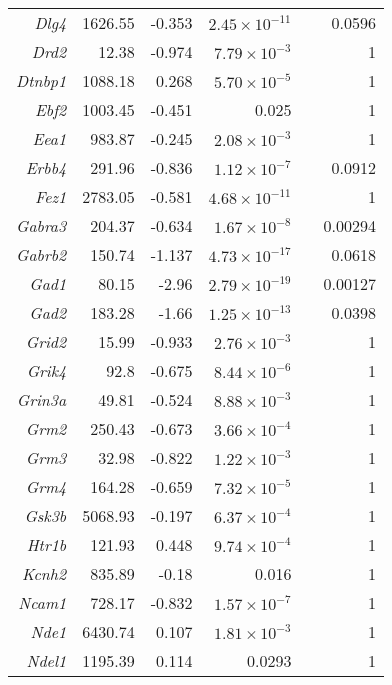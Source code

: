 {\begin{longtable}{rrrrrr}
    \textit{Dlg4} & 1626.55 & -0.353 & $2.45\times 10^{-11}$ &       & 0.0596 \\
    \textit{Drd2} & 12.38 & -0.974 & $7.79\times 10^{-3}$ &       & 1 \\
    \textit{Dtnbp1} & 1088.18 & 0.268 & $5.70\times 10^{-5}$ &       & 1 \\
    \textit{Ebf2} & 1003.45 & -0.451 & 0.025 &       & 1 \\
    \textit{Eea1} & 983.87 & -0.245 & $2.08\times 10^{-3}$ &       & 1 \\
    \textit{Erbb4} & 291.96 & -0.836 & $1.12\times 10^{-7}$ &       & 0.0912 \\
    \textit{Fez1} & 2783.05 & -0.581 & $4.68\times 10^{-11}$ &       & 1 \\
    \textit{Gabra3} & 204.37 & -0.634 & $1.67\times 10^{-8}$ &       & 0.00294 \\
    \textit{Gabrb2} & 150.74 & -1.137 & $4.73\times 10^{-17}$ &       & 0.0618 \\
    \textit{Gad1} & 80.15 & -2.96 & $2.79\times 10^{-19}$ &       & 0.00127 \\
    \textit{Gad2} & 183.28 & -1.66 & $1.25\times 10^{-13}$ &       & 0.0398 \\
    \textit{Grid2} & 15.99 & -0.933 & $2.76\times 10^{-3}$ &       & 1 \\
    \textit{Grik4} & 92.8  & -0.675 & $8.44\times 10^{-6}$ &       & 1 \\
    \textit{Grin3a} & 49.81 & -0.524 & $8.88\times 10^{-3}$ &       & 1 \\
    \textit{Grm2} & 250.43 & -0.673 & $3.66\times 10^{-4}$ &       & 1 \\
    \textit{Grm3} & 32.98 & -0.822 & $1.22\times 10^{-3}$ &       & 1 \\
    \textit{Grm4} & 164.28 & -0.659 & $7.32\times 10^{-5}$ &       & 1 \\
    \textit{Gsk3b} & 5068.93 & -0.197 & $6.37\times 10^{-4}$ &       & 1 \\
    \textit{Htr1b} & 121.93 & 0.448 & $9.74\times 10^{-4}$ &       & 1 \\
    \textit{Kcnh2} & 835.89 & -0.18 & 0.016 &       & 1 \\
    \textit{Ncam1} & 728.17 & -0.832 & $1.57\times 10^{-7}$ &       & 1 \\
    \textit{Nde1} & 6430.74 & 0.107 & $1.81\times 10^{-3}$ &       & 1 \\
    \textit{Ndel1} & 1195.39 & 0.114 & 0.0293 &       & 1 \\

\end{longtable}}
